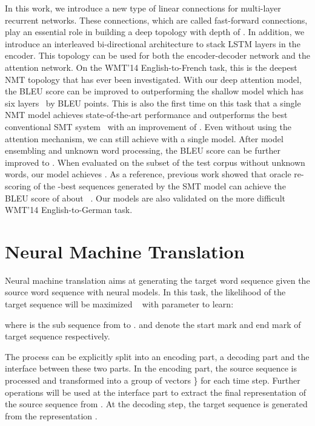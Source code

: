 \documentclass[11pt,letterpaper]{article}
\begin{document}
In this work, we introduce a new type of linear connections for multi-layer recurrent networks. These connections, which are called
fast-forward connections, play an essential role in building a deep topology with depth of .   In addition, we introduce an interleaved bi-directional architecture  to stack LSTM layers in the
encoder.  This topology can be used for both the encoder-decoder network and the attention  network. On
the WMT'14 English-to-French task, this is the deepest NMT topology that has ever been investigated. With our deep attention model,
the BLEU score can be improved to    outperforming the shallow model which has six layers~\cite{Luong-Zaremba-ACL2015} by 
BLEU points. This is also the first time on this task that a single NMT model achieves state-of-the-art performance and outperforms the best
conventional SMT system~\cite{Durrani-Heafield-WMT2014} with an improvement of . Even without using the attention mechanism, we
can still achieve  with a single model.    After model ensembling and unknown word processing, the BLEU score can be further improved to
. When evaluated on the subset of the test corpus without unknown words, our model achieves . As a reference, previous
work showed that oracle re-scoring of the -best sequences  generated by the SMT model can achieve the BLEU score of about
~\cite{Sutskever-Le-NIPS2014}. Our models are also validated on the more difficult WMT'14 English-to-German task.

\section{Neural Machine Translation}
\label{sec:NMT}
Neural machine translation aims at generating the target word sequence  given the source word sequence
 with neural models. In this task, the likelihood 
of the target sequence will be maximized ~\cite{Forcada-Neco-1997} with parameter  to learn:

where  is the sub sequence from  to .  and  denote the start mark and end mark of target
sequence respectively.

The process can be explicitly split into an encoding part, a decoding part and the interface between these two parts. In the
encoding part, the source sequence is processed and transformed into a group of vectors \} for each time
step. Further operations will be used at the interface part to extract the final representation  of the source sequence from
. At  the decoding step, the target sequence is generated from the representation .
\end{document}
